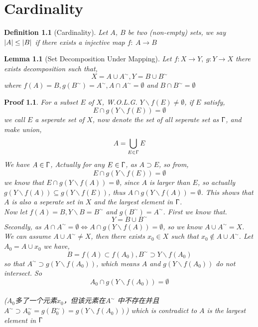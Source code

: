 \chapter{Cardinality}
\newtheorem*{myDef}{Definition}
\newtheorem*{myTheo}{Theorem}
\newtheorem*{myPf}{Proof}
\newtheorem*{myLemma}{Lemma}
\begin{myDef}[Cardinality]
Let $A$, $B$ be two (non-empty) sets, we say  $\lvert A\rvert\leq\lvert B\rvert$ if there exists a injective map $f:\ A\rightarrow B$
\end{myDef}


\begin{myLemma}[Set Decomposition Under Mapping]
	Let $f: X\rightarrow Y,\ g: Y\rightarrow X$ there exists decomposition such that,
	\[X = A\cup A^{\sim}, Y=B\cup B^{\sim}\]
	where $f(A)=B, g(B^\sim)=A^\sim, A\cap A^\sim=\emptyset$ and $B\cap B^\sim=\emptyset$
\end{myLemma}
\begin{myPf}
	For a subset $E$ of $X$, W.O.L.G. $Y\backslash f(E)\neq\emptyset$, if $E$ satisfy,
	\[E\cap g(Y\backslash f(E))=\emptyset\]
	we call $E$ a seperate set of $X$, now denote the set of all seperate set as $\Upgamma$, and make union,
	\[A=\bigcup_{E\in \Upgamma}E\]
	We have $A\in \Upgamma$, Actually for any $E\in \Upgamma$, as $A\supset E$, so from,
	\[E\cap g(Y\backslash f(E))=\emptyset\]
	we know that $E\cap g(Y\backslash f(A))=\emptyset$, since $A$ is larger than $E$, so actually $g(Y\backslash f(A))\subseteq g(Y\backslash f(E))$, thus $A\cap g(Y\backslash f(A))=\emptyset$. This shows that $A$ is also a seperate set in $X$ and the largest element in $\Upgamma$.
	\\
	Now let $f(A)=B, Y\backslash B=B^\sim$ and $g(B^\sim)=A^\sim$. First we know that.
	\[Y=B\cup B^\sim\]
	Secondly, as $A\cap A^\sim=\emptyset\Leftrightarrow A\cap g(Y\backslash f(A))=\emptyset$, so we know $A\cup A^\sim=X$.
	\\
	We can assume $A\cup A^\sim \neq X$, then there exists $x_0\in X$ such that $x_0\notin A\cup A^\sim$. Let $A_0=A\cup {x_0}$ we have,
	\[B=f(A)\subset f(A_0), B^\sim \supset Y\backslash f(A_0)\]
	so that $A^\sim \supset g(Y\backslash f(A_0))$, which means $A$ and $g(Y\backslash f(A_0))$ do not intersect. So
	\[A_0\cap g(Y\backslash f(A_0))=\emptyset\]
	\\($A_0$多了一个元素$x_0$，但该元素在$A^\sim$ 中不存在并且$A^\sim \supset A_0^\sim=g(B_0^\sim) = g(Y\backslash f(A_0))$)
	which is contradict to $A$ is the largest element in $\Upgamma$
\end{myPf}
